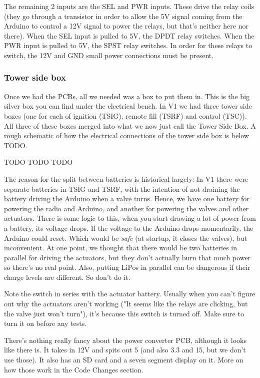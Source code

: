 \documentclass[11pt]{article}
\begin{document}
The remaining 2 inputs are the SEL and PWR inputs. These drive the relay coils
(they go through a transistor in order to allow the 5V signal coming from the
Arduino to control a 12V signal to power the relays, but that's neither here nor
there). When the SEL input is pulled to 5V, the DPDT relay switches. When the
PWR input is pulled to 5V, the SPST relay switches. In order for these relays to
switch, the 12V and GND small power connections must be present.

\subsubsection{Tower side box}
\label{sec:org4e78237}

Once we had the PCBs, all we needed was a box to put them in. This is the big
silver box you can find under the electrical bench. In V1 we had three tower
side boxes (one for each of ignition (TSIG), remote fill (TSRF) and control
(TSC)). All three of these boxes merged into what we now just call the Tower
Side Box. A rough schematic of how the electrical connections of the tower side
box is below TODO.

TODO TODO TODO

The reason for the split between batteries is historical largely: In V1 there
were separate batteries in TSIG and TSRF, with the intention of not draining the
battery driving the Arduino when a valve turns. Hence, we have one battery for
powering the radio and Arduino, and another for powering the valves and other
actuators. There is some logic to this, when you start drawing a lot of power
from a battery, its voltage drops. If the voltage to the Arduino drops
momentarily, the Arduino could reset. Which would be \emph{safe} (at startup, it
closes the valves), but inconvenient. At one point, we thought that there would
be two batteries in parallel for driving the actuators, but they don't actually
burn that much power so there's no real point. Also, putting LiPos in parallel
can be dangerous if their charge levels are different. So don't do it.

Note the switch in series with the actuator battery. Usually when you can't
figure out why the actuators aren't working ("It seems like the relays are
clicking, but the valve just won't turn"), it's because this switch is turned
off. Make sure to turn it on before any tests.

There's nothing really fancy about the power converter PCB, although it looks
like there is. It takes in 12V and spits out 5 (and also 3.3 and 15, but we
don't use those). It also has an SD card and a seven segment display on it. More
on how those work in the Code Changes section.
\end{document}
